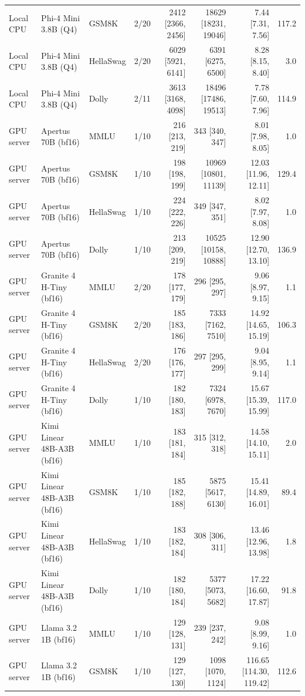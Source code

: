 \begin{longtable}{@{}l l l c r r r r@{}}
Local CPU & Phi-4 Mini 3.8B (Q4) & GSM8K & 2/20 & 2412 [2366, 2456] & 18629 [18231, 19046] & 7.44 [7.31, 7.56] & 117.2 \\
Local CPU & Phi-4 Mini 3.8B (Q4) & HellaSwag & 2/20 & 6029 [5921, 6141] & 6391 [6275, 6500] & 8.28 [8.15, 8.40] & 3.0 \\
Local CPU & Phi-4 Mini 3.8B (Q4) & Dolly & 2/11 & 3613 [3168, 4098] & 18496 [17486, 19513] & 7.78 [7.60, 7.96] & 114.9 \\
\midrule
GPU server & Apertus 70B (bf16) & MMLU & 1/10 & 216 [213, 219] & 343 [340, 347] & 8.01 [7.98, 8.05] & 1.0 \\
GPU server & Apertus 70B (bf16) & GSM8K & 1/10 & 198 [198, 199] & 10969 [10801, 11139] & 12.03 [11.96, 12.11] & 129.4 \\
GPU server & Apertus 70B (bf16) & HellaSwag & 1/10 & 224 [222, 226] & 349 [347, 351] & 8.02 [7.97, 8.08] & 1.0 \\
GPU server & Apertus 70B (bf16) & Dolly & 1/10 & 213 [209, 219] & 10525 [10158, 10888] & 12.90 [12.70, 13.10] & 136.9 \\
GPU server & Granite 4 H-Tiny (bf16) & MMLU & 2/20 & 178 [177, 179] & 296 [295, 297] & 9.06 [8.97, 9.15] & 1.1 \\
GPU server & Granite 4 H-Tiny (bf16) & GSM8K & 2/20 & 185 [183, 186] & 7333 [7162, 7510] & 14.92 [14.65, 15.19] & 106.3 \\
GPU server & Granite 4 H-Tiny (bf16) & HellaSwag & 2/20 & 176 [176, 177] & 297 [295, 299] & 9.04 [8.95, 9.14] & 1.1 \\
GPU server & Granite 4 H-Tiny (bf16) & Dolly & 1/10 & 182 [180, 183] & 7324 [6978, 7670] & 15.67 [15.39, 15.99] & 117.0 \\
GPU server & Kimi Linear 48B-A3B (bf16) & MMLU & 1/10 & 183 [181, 184] & 315 [312, 318] & 14.58 [14.10, 15.11] & 2.0 \\
GPU server & Kimi Linear 48B-A3B (bf16) & GSM8K & 1/10 & 185 [182, 188] & 5875 [5617, 6130] & 15.41 [14.89, 16.01] & 89.4 \\
GPU server & Kimi Linear 48B-A3B (bf16) & HellaSwag & 1/10 & 183 [182, 184] & 308 [306, 311] & 13.46 [12.96, 13.98] & 1.8 \\
GPU server & Kimi Linear 48B-A3B (bf16) & Dolly & 1/10 & 182 [180, 184] & 5377 [5073, 5682] & 17.22 [16.60, 17.87] & 91.8 \\
GPU server & Llama 3.2 1B (bf16) & MMLU & 1/10 & 129 [128, 131] & 239 [237, 242] & 9.08 [8.99, 9.16] & 1.0 \\
GPU server & Llama 3.2 1B (bf16) & GSM8K & 1/10 & 129 [127, 130] & 1098 [1070, 1124] & 116.65 [114.30, 119.42] & 112.6 \\

\end{longtable}

